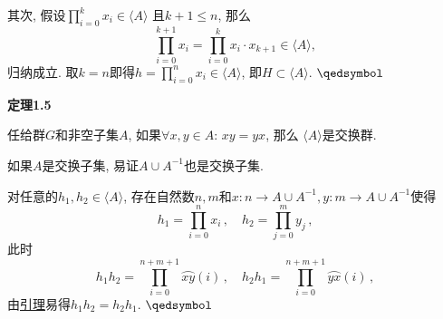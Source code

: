 \documentclass[UTF8]{ctexart}
\begin{document}
其次, 假设$\displaystyle\prod_{i=0}^kx_i\in\langle A\rangle$
且$k+1\leqslant n$, 那么
\[
    \prod_{i=0}^{k+1}x_i=\prod_{i=0}^kx_i\cdot x_{k+1}\in\langle A\rangle,
\]
归纳成立. 取$k=n$即得$\displaystyle h=\prod_{i=0}^nx_i\in\langle A\rangle$,
即$H\subset\langle A\rangle$. \hfill $\qedsymbol$

\vspace{13pt}

\hypertarget{sec:定理1.5}{}
\noindent\textbf{定理1.5}

任给群$G$和非空子集$A$, 如果$\forall x,y\in A:\,xy=yx$, 那么
$\langle A\rangle$是交换群.


如果$A$是交换子集, 易证$A\cup A^{-1}$也是交换子集.

对任意的$h_1,h_2\in\langle A\rangle$, 存在自然数$n,m$和$x:n\to A\cup A^{-1},
y:m\to A\cup A^{-1}$使得
\vspace{3pt}
\[
    h_1=\prod_{i=0}^nx_i\,,\quad h_2=\prod_{j=0}^my_j\,,
\]
此时
\[
    h_1h_2=\prod_{i=0}^{n+m+1}\wideparen{xy}(i)\,,\quad
    h_2h_1=\prod_{i=0}^{n+m+1}\wideparen{yx}(i)\,,
\]
由\href{../../../01 基础集合论/03 自然数/04 有限求和/01 有序求和#nameddest=sec:定理2.2}
{引理}易得$h_1h_2=h_2h_1$. \hfill $\qedsymbol$
\end{document}
